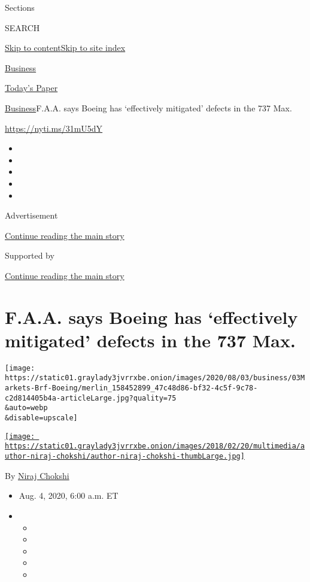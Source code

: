Sections

SEARCH

\protect\hyperlink{site-content}{Skip to
content}\protect\hyperlink{site-index}{Skip to site index}

\href{https://www.nytimes3xbfgragh.onion/section/business}{Business}

\href{https://myaccount.nytimes3xbfgragh.onion/auth/login?response_type=cookie\&client_id=vi}{}

\href{https://www.nytimes3xbfgragh.onion/section/todayspaper}{Today's
Paper}

\href{/section/business}{Business}\textbar{}F.A.A. says Boeing has
`effectively mitigated' defects in the 737 Max.

\url{https://nyti.ms/31mU5dY}

\begin{itemize}
\item
\item
\item
\item
\item
\end{itemize}

Advertisement

\protect\hyperlink{after-top}{Continue reading the main story}

Supported by

\protect\hyperlink{after-sponsor}{Continue reading the main story}

\hypertarget{faa-says-boeing-has-effectively-mitigated-defects-in-the-737-max}{%
\section{F.A.A. says Boeing has `effectively mitigated' defects in the
737
Max.}\label{faa-says-boeing-has-effectively-mitigated-defects-in-the-737-max}}

\texttt{[image: https://static01.graylady3jvrrxbe.onion/images/2020/08/03/business/03Markets-Brf-Boeing/merlin\_158452899\_47c48d86-bf32-4c5f-9c78-c2d814405b4a-articleLarge.jpg?quality=75\\\&auto=webp\\\&disable=upscale]}

\href{https://www.nytimes3xbfgragh.onion/by/niraj-chokshi}{\texttt{[image: https://static01.graylady3jvrrxbe.onion/images/2018/02/20/multimedia/author-niraj-chokshi/author-niraj-chokshi-thumbLarge.jpg]}}

By \href{https://www.nytimes3xbfgragh.onion/by/niraj-chokshi}{Niraj
Chokshi}

\begin{itemize}
\item
  Aug. 4, 2020, 6:00 a.m. ET
\item
  \begin{itemize}
  \item
  \item
  \item
  \item
  \item
  \end{itemize}
\end{itemize}

